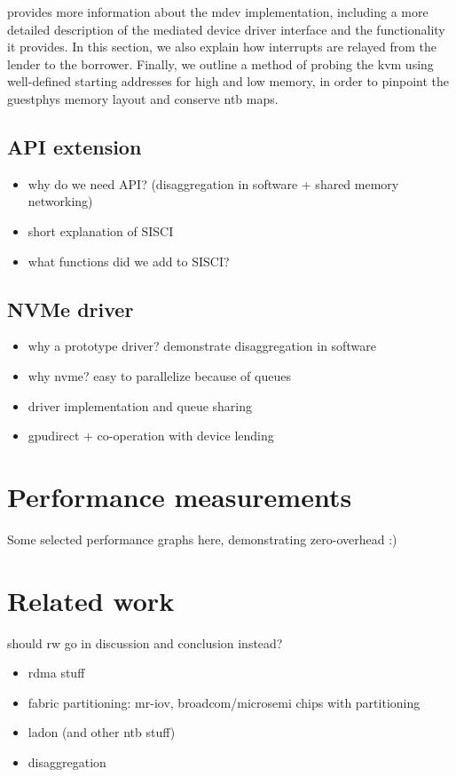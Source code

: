  provides more information about the \gls{mdev} implementation, including a more detailed description of the mediated device driver interface and the functionality it provides. 
%
In this section, we also explain how interrupts are relayed from the \gls{lender} to the \gls{borrower}.
%
Finally, we outline a method of probing the \gls{kvm} using well-defined starting addresses for high and low memory, in order to pinpoint the \gls{guestphys} memory layout and conserve \gls{ntb} maps.



\subsection{API extension}\label{sec:api}
\begin{itemize}
    \item why do we need API? (disaggregation in software + shared memory networking)
    \item short explanation of SISCI
    \item what functions did we add to SISCI?
\end{itemize}



\subsection{NVMe driver}\label{sec:nvme}
\begin{itemize}
    \item why a prototype driver? demonstrate disaggregation in software
    \item why nvme? easy to parallelize because of queues
    \item driver implementation and queue sharing
    \item gpudirect + co-operation with device lending
\end{itemize}


\section{Performance measurements}\label{sec:eval}
Some selected performance graphs here, demonstrating zero-overhead :)

\section{Related work}\label{sec:rw}
should rw go in discussion and conclusion instead?
\begin{itemize}
    \item rdma stuff
    \item fabric partitioning: mr-iov, broadcom/microsemi chips with partitioning
    \item ladon (and other ntb stuff)
    \item disaggregation
\end{itemize}

